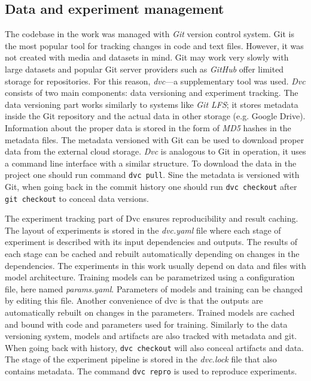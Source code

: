 \subsection{Data and experiment management}
The codebase in the work was managed with \textit{Git} version control system.
Git is the most popular tool for tracking changes in code and text files.
However, it was not created with media and datasets in mind.
Git may work very slowly with large datasets and popular Git server providers such as \textit{GitHub} offer limited storage for repositories.
For this reason, \textit{dvc}---a supplementary tool was used.
\textit{Dvc} consists of two main components: data versioning and experiment tracking.
The data versioning part works similarly to systems like \textit{Git LFS}; it stores metadata inside the Git repository and the actual data in other storage (e.g. Google Drive).
Information about the proper data is stored in the form of \textit{MD5} hashes in the metadata files.
The metadata versioned with Git can be used to download proper data from the external cloud storage.
\textit{Dvc} is analogous to Git in operation, it uses a command line interface with a similar structure.
To download the data in the project one should run command \texttt{dvc pull}.
Sine the metadata is versioned with Git, when going back in the commit history one should run \texttt{dvc checkout} after \texttt{git checkout} to conceal data versions.

The experiment tracking part of Dvc ensures reproducibility and result caching.
The layout of experiments is stored in the \textit{dvc.yaml} file where each stage of experiment is described with its input dependencies and outputs.
The results of each stage can be cached and rebuilt automatically depending on changes in the dependencies.
The experiments in this work usually depend on data and files with model architecture.
Training models can be parametrized using a configuration file, here named \textit{params.yaml}.
Parameters of models and training can be changed by editing this file.
Another convenience of dvc is that the outputs are automatically rebuilt on changes in the parameters.
Trained models are cached and bound with code and parameters used for training.
Similarly to the data versioning system, models and artifacts are also tracked with metadata and git.
When going back with history, \texttt{dvc checkout} will also conceal artifacts and data.
The stage of the experiment pipeline is stored in the \textit{dvc.lock} file that also contains metadata.
The command \texttt{dvc repro} is used to reproduce experiments.

